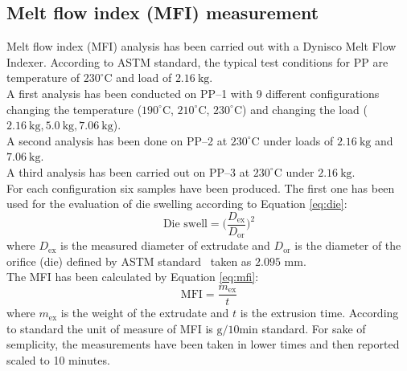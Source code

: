 \documentclass[a4paper, 11pt]{article}
\begin{document}
\subsection{Melt flow index (MFI) measurement}

Melt flow index (MFI) analysis has been carried out with a Dynisco Melt Flow Indexer. According to ASTM standard, the typical test conditions for PP are temperature of $230 ^\circ$C and load of $2.16\  \text{kg}$. \\
A first analysis has been conducted on PP–1 with 9 different configurations changing the temperature ($190 ^\circ$C, $210 ^\circ$C, $230 ^\circ$C) and changing the load ($2.16\ \text{kg}, 5.0\ \text{kg}, 7.06 \ \text{kg}$). \\
A second analysis has been done on PP–2 at $230 ^\circ$C under loads of  $2.16\ \text{kg}$ and  $7.06\ \text{kg}$. \\
A third analysis has been carried out on PP–3 at $230 ^\circ$C under $2.16\ \text{kg}$. \\
For each configuration six samples have been produced. The first one has been used for the evaluation of die swelling according to Equation \ref{eq:die}:
\begin{equation}
\text{Die\ swell} = \bigg(\frac{D_\text{ex}}{D_\text{or}}\bigg)^2
\label{eq:die}
\end{equation}
where $D_\text{ex}$ is the measured diameter of extrudate and $D_\text{or}$ is the diameter of the orifice (die) defined by ASTM standard~\cite{MFI} taken as $2.095$ mm. \\
The MFI has been calculated by Equation \ref{eq:mfi}: 
\begin{equation}
\text{MFI} = \frac{m_\text{ex}}{t}
\label{eq:mfi}
\end{equation}
where $m_\text{ex}$ is the weight of the extrudate and $t$ is the extrusion time. According to standard the unit of measure of MFI is $\text{g/10min}$ standard. For sake of semplicity, the measurements have been taken in lower times and then reported scaled to 10 minutes. 
\end{document}
